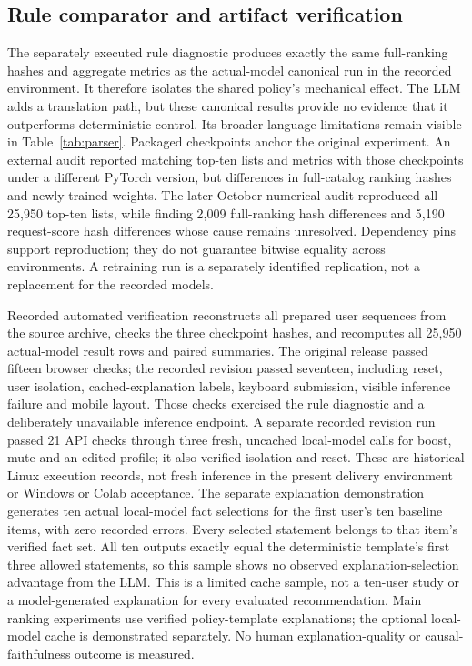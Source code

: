 \documentclass[conference]{IEEEtran}
\begin{document}
\subsection{Rule comparator and artifact verification}
The separately executed rule diagnostic produces exactly the same full-ranking hashes and aggregate metrics as the actual-model canonical run in the recorded environment. It therefore isolates the shared policy's mechanical effect. The LLM adds a translation path, but these canonical results provide no evidence that it outperforms deterministic control. Its broader language limitations remain visible in Table~\ref{tab:parser}. Packaged checkpoints anchor the original experiment. An external audit reported matching top-ten lists and metrics with those checkpoints under a different PyTorch version, but differences in full-catalog ranking hashes and newly trained weights. The later October numerical audit reproduced all 25,950 top-ten lists, while finding 2,009 full-ranking hash differences and 5,190 request-score hash differences whose cause remains unresolved. Dependency pins support reproduction; they do not guarantee bitwise equality across environments. A retraining run is a separately identified replication, not a replacement for the recorded models.

Recorded automated verification reconstructs all prepared user sequences from the source archive, checks the three checkpoint hashes, and recomputes all 25,950 actual-model result rows and paired summaries. The original release passed fifteen browser checks; the recorded revision passed seventeen, including reset, user isolation, cached-explanation labels, keyboard submission, visible inference failure and mobile layout. Those checks exercised the rule diagnostic and a deliberately unavailable inference endpoint. A separate recorded revision run passed 21 API checks through three fresh, uncached local-model calls for boost, mute and an edited profile; it also verified isolation and reset. These are historical Linux execution records, not fresh inference in the present delivery environment or Windows or Colab acceptance.
The separate explanation demonstration generates ten actual local-model fact selections for the first user's ten baseline items, with zero recorded errors. Every selected statement belongs to that item's verified fact set. All ten outputs exactly equal the deterministic template's first three allowed statements, so this sample shows no observed explanation-selection advantage from the LLM. This is a limited cache sample, not a ten-user study or a model-generated explanation for every evaluated recommendation. Main ranking experiments use verified policy-template explanations; the optional local-model cache is demonstrated separately. No human explanation-quality or causal-faithfulness outcome is measured.
\end{document}
